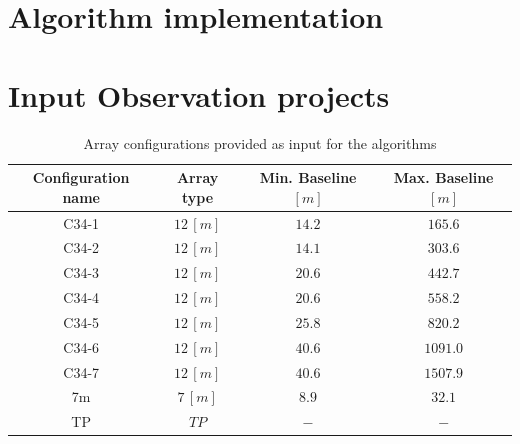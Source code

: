 \section {Algorithm implementation}

\section {Input Observation projects}

\begin{table}
\begin{center}
\begin{tabular}{|c|c|c|c|}
\hline
Configuration name & Array type & Min. Baseline $[m]$ & Max. Baseline $[m]$\\
\hline
C34-1 & $12\,[m]$ & $14.2$ & $165.6$ \\
\hline
C34-2 & $12\,[m]$ & $14.1$ & $303.6$ \\
\hline
C34-3 & $12\,[m]$ & $20.6$ & $442.7$ \\
\hline
C34-4 & $12\,[m]$ & $20.6$ & $558.2$ \\
\hline
C34-5 & $12\,[m]$ & $25.8$ & $820.2$ \\
\hline
C34-6 & $12\,[m]$ & $40.6$ & $1091.0$ \\
\hline
C34-7 & $12\,[m]$ & $40.6$ & $1507.9$ \\
\hline
7m    & $7\,[m]$  & $8.9$  & $32.1$ \\
\hline
TP    & $TP$      & $-$    & $-$ \\
\hline
\end{tabular}
\end{center}
\caption{Array configurations provided as input for the algorithms}
\label{table:input-array-configs}
\end{table}

